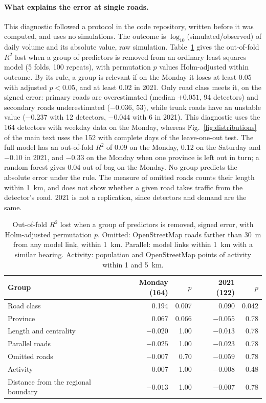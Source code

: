 \documentclass[11pt,a4paper]{article}
\begin{document}
\paragraph{What explains the error at single roads.} This diagnostic followed a protocol in the code repository, written before it was computed, and uses no simulations. The outcome is $\log_{10}$(simulated/observed) of daily volume and its absolute value, raw simulation. Table~\ref{tab:road_error} gives the out-of-fold $R^2$ lost when a group of predictors is removed from an ordinary least squares model (5 folds, 100 repeats), with permutation $p$ values Holm-adjusted within outcome. By its rule, a group is relevant if on the Monday it loses at least 0.05 with adjusted $p<0.05$, and at least 0.02 in 2021. Only road class meets it, on the signed error: primary roads are overestimated (median $+0.051$, 94 detectors) and secondary roads underestimated ($-0.036$, 53), while trunk roads have an unstable value ($-0.237$ with 12 detectors, $-0.044$ with 6 in 2021). This diagnostic uses the 164 detectors with weekday data on the Monday, whereas Fig.~\ref{fig:distributions} of the main text uses the 152 with complete days of the leave-one-out test. The full model has an out-of-fold $R^2$ of 0.09 on the Monday, 0.12 on the Saturday and $-0.10$ in 2021, and $-0.33$ on the Monday when one province is left out in turn; a random forest gives 0.04 out of bag on the Monday. No group predicts the absolute error under the rule. The measure of omitted roads counts their length within 1~km, and does not show whether a given road takes traffic from the detector's road. 2021 is not a replication, since detectors and demand are the same.

\begin{table}[htbp]
\centering
\caption{Out-of-fold $R^2$ lost when a group of predictors is removed, signed error, with Holm-adjusted permutation $p$. Omitted: OpenStreetMap roads farther than 30~m from any model link, within 1~km. Parallel: model links within 1~km with a similar bearing. Activity: population and OpenStreetMap points of activity within 1 and 5~km.}
\label{tab:road_error}
\begin{tabular}{@{}lrrrr@{}}
\toprule
Group & Monday (164) & $p$ & 2021 (122) & $p$ \\
\midrule
Road class & 0.194 & 0.007 & 0.090 & 0.042 \\
Province & 0.067 & 0.066 & $-0.055$ & 0.78 \\
Length and centrality & $-0.020$ & 1.00 & $-0.013$ & 0.78 \\
Parallel roads & $-0.025$ & 1.00 & $-0.023$ & 0.78 \\
Omitted roads & $-0.007$ & 0.70 & $-0.059$ & 0.78 \\
Activity & 0.007 & 1.00 & $-0.008$ & 0.48 \\
Distance from the regional boundary & $-0.013$ & 1.00 & $-0.007$ & 0.78 \\
\bottomrule
\end{tabular}
\end{table}
\end{document}
